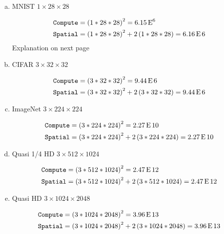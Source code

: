 \documentclass[11pt]{article}
\begin{document}
\begin{enumerate}[(a)]\itemsep0pt
    \item MNIST $1 \times 28 \times 28$
\begin{solution}
	\begin{align}
		\texttt{Compute} &= \left(1*28*28\right)^2 = 6.15\operatorname{E}^{6} \\
		\texttt{Spatial} &= \left(1*28*28\right)^2 + 2\left(1*28*28\right) =
		6.16\operatorname{E}6
	\end{align}
	Explanation on next page
\end{solution}
    \item CIFAR $3 \times 32 \times 32$
\begin{solution}
	\begin{align}
		\texttt{Compute} &= \left(3*32*32\right)^2 = 9.44\operatorname{E}6 \\
		\texttt{Spatial} &= \left(3*32*32\right)^2 + 2\left(3*32*32\right) =
		9.44\operatorname{E}6
	\end{align}
\end{solution}
    \item ImageNet $3 \times 224 \times 224$
\begin{solution}
	\begin{align}
		\texttt{Compute} &= \left(3*224*224\right)^2 = 2.27\operatorname{E}10 \\
		\texttt{Spatial} &= \left(3*224*224\right)^2 + 2\left(3*224*224\right)
		= 2.27\operatorname{E}10
	\end{align}
\end{solution}
    \item Quasi 1/4 HD $3 \times 512 \times 1024$
\begin{solution}
	\begin{align}
		\texttt{Compute} &= \left(3*512*1024\right)^2 = 2.47\operatorname{E}12 \\
		\texttt{Spatial} &= \left(3*512*1024\right)^2 +
		2\left(3*512*1024\right) = 2.47\operatorname{E}12
	\end{align}
\end{solution}
    \item Quasi HD $3 \times 1024 \times 2048$
\begin{solution}
	\begin{align}
		\texttt{Compute} &= \left(3*1024*2048\right)^2 = 3.96\operatorname{E}13 \\
		\texttt{Spatial} &= \left(3*1024*2048\right)^2 +
		2\left(3*1024*2048\right) = 3.96\operatorname{E}13
	\end{align}
\end{solution}
\end{enumerate}
\end{document}

